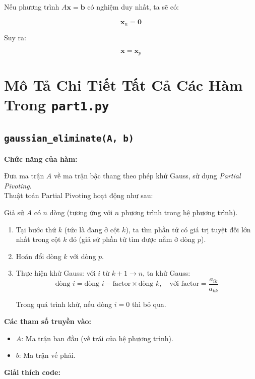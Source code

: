\documentclass[a4paper,12pt]{report}
\begin{document}
Nếu phương trình $A\mathbf{x} = \mathbf{b}$ có nghiệm duy nhất, ta sẽ có:

\[
\mathbf{x}_n = \mathbf{0}
\]

Suy ra:

\[
\mathbf{x} = \mathbf{x}_p
\]

\section{Mô Tả Chi Tiết Tất Cả Các Hàm Trong \texttt{part1.py}}
\subsection[gaussian\_eliminate(A, b)]{\texttt{gaussian\_eliminate(A, b)}}
\textbf{Chức năng của hàm:}

Đưa ma trận $A$ về ma trận bậc thang theo phép khử Gauss, sử dụng \textit{Partial Pivoting}.\\ 
Thuật toán Partial Pivoting hoạt động như sau:

\medskip

Giả sử $A$ có $n$ dòng (tương ứng với $n$ phương trình trong hệ phương trình).
\begin{enumerate}
    \item Tại bước thứ $k$ (tức là đang ở cột $k$), ta tìm phần tử có giá trị tuyệt đối lớn nhất trong cột $k$ đó (giả sử phần tử tìm được nằm ở dòng $p$).
    
    \item Hoán đổi dòng $k$ với dòng $p$.
    
    \item Thực hiện khử Gauss: với $i$ từ $k+1 \rightarrow n$, ta khử Gauss:
    \[
    \text{dòng } i = \text{dòng } i - \text{factor} \times \text{dòng } k,\quad 
    \text{với } \text{factor} = \frac{a_{ik}}{a_{kk}}
    \]
    
    Trong quá trình khử, nếu dòng $i = 0$ thì bỏ qua.
\end{enumerate}

\noindent\textbf{Các tham số truyền vào:}
\begin{itemize}
    \item $A$: Ma trận ban đầu (vế trái của hệ phương trình).
    \item $b$: Ma trận vế phải.
\end{itemize}

\noindent\textbf{Giải thích code:}
\end{document}
